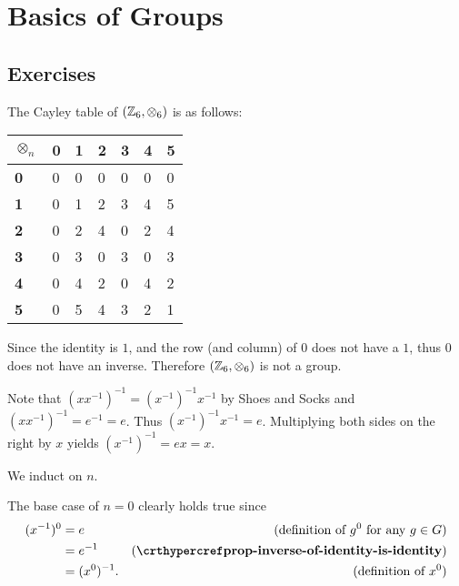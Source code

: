 \section{Basics of Groups}
\subsection*{Exercises}
\begin{questions}
    \item The Cayley table of $(\mathbb{Z}_6, \otimes_6)$ is as follows:
    \begin{table}[H]
        \centering
        \begin{tabular}{|l|l|l|l|l|l|l|}
        \hline
        \textbf{$\otimes_n$} & \textbf{0} & \textbf{1} & \textbf{2} & \textbf{3} & \textbf{4} & \textbf{5} \\ \hline
        \textbf{0}       & 0          & 0          & 0          & 0          & 0          & 0          \\ \hline
        \textbf{1}       & 0          & 1          & 2          & 3          & 4          & 5          \\ \hline
        \textbf{2}       & 0          & 2          & 4          & 0          & 2          & 4          \\ \hline
        \textbf{3}       & 0          & 3          & 0          & 3          & 0          & 3          \\ \hline
        \textbf{4}       & 0          & 4          & 2          & 0          & 4          & 2          \\ \hline
        \textbf{5}       & 0          & 5          & 4          & 3          & 2          & 1          \\ \hline
        \end{tabular}
    \end{table}

    Since the identity is $1$, and the row (and column) of 0 does not have a $1$, thus $0$ does not have an inverse. Therefore $(\mathbb{Z}_6, \otimes_6)$ is not a group.

    \item Note that $(xx^{-1})^{-1} = (x^{-1})^{-1}x^{-1}$ by Shoes and Socks and $(xx^{-1})^{-1} = e^{-1} = e$. Thus $(x^{-1})^{-1}x^{-1} = e$. Multiplying both sides on the right by $x$ yields $(x^{-1})^{-1} = ex = x$.

    \item We induct on $n$.

    The base case of $n = 0$ clearly holds true since
    \begin{align*}
        (x^{-1})^0 &= e & (\text{definition of }g^0 \text{ for any }g\in G)\\
        &= e^{-1} & (\myref{prop-inverse-of-identity-is-identity})\\
        &= (x^0)^{-1}. & (\text{definition of }x^0)
    \end{align*}


\end{questions}
